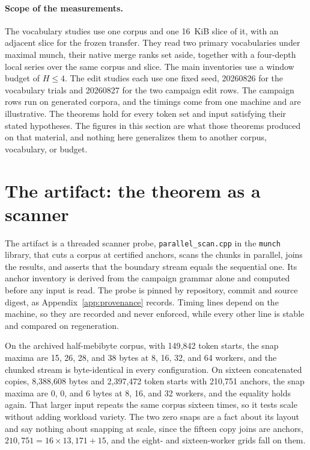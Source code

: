\documentclass[11pt,a4paper]{article}
\theoremstyle{definition}
\theoremstyle{plain}
\newcommand{\code}[1]{\texttt{#1}}
\begin{document}
\paragraph{Scope of the measurements.} The vocabulary studies use one corpus and one 16~KiB slice of it, with an
adjacent slice for the frozen transfer. They read two primary vocabularies under maximal munch, their native merge ranks
set aside, together with a four-depth local series over the same corpus and slice. The main inventories use a window
budget of $H \le 4$. The edit studies each use one fixed seed, 20260826 for the vocabulary trials and 20260827 for the
two campaign edit rows. The campaign rows run on generated corpora, and the timings come from one machine and are
illustrative. The theorems hold for every token set and input satisfying their stated hypotheses. The figures in this
section are what those theorems produced on that material, and nothing here generalizes them to another corpus,
vocabulary, or budget.

\FloatBarrier
\section{The artifact: the theorem as a scanner}\label{sec:artifact}

The artifact is a threaded scanner probe, \code{parallel\_scan.cpp} in the \code{munch} library, that cuts a corpus at
certified anchors, scans the chunks in parallel, joins the results, and asserts that the boundary stream equals the
sequential one. Its anchor inventory is derived from the campaign grammar alone and computed before any input is read.
The probe is pinned by repository, commit and source digest, as Appendix~\ref{app:provenance} records. Timing lines
depend on the machine, so they are recorded and never enforced, while every other line is stable and compared on
regeneration.

On the archived half-mebibyte corpus, with 149{,}842 token starts, the snap maxima are 15, 26, 28, and 38 bytes at 8,
16, 32, and 64 workers, and the chunked stream is byte-identical in every configuration. On sixteen concatenated copies,
8{,}388{,}608 bytes and 2{,}397{,}472 token starts with 210{,}751 anchors, the snap maxima are 0, 0, and 6 bytes at 8,
16, and 32 workers, and the equality holds again. That larger input repeats the same corpus sixteen times, so it tests
scale without adding workload variety. The two zero snaps are a fact about its layout and say nothing about snapping at
scale, since the fifteen copy joins are anchors, $210{,}751 = 16 \times 13{,}171 + 15$, and the eight- and
sixteen-worker grids fall on them.
\end{document}
